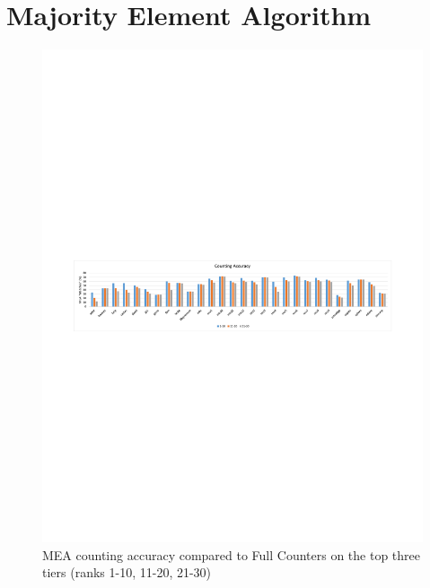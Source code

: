 
\section{Majority Element Algorithm}
\label{sec:MEA}

\begin{figure}[t]
  \includegraphics[width=\textwidth]{figures/mea_1.pdf}
  \caption{MEA counting accuracy compared to Full Counters on the top three tiers (ranks 1-10, 11-20, 21-30)}
  \label{fig:mea_1}
\end{figure}

